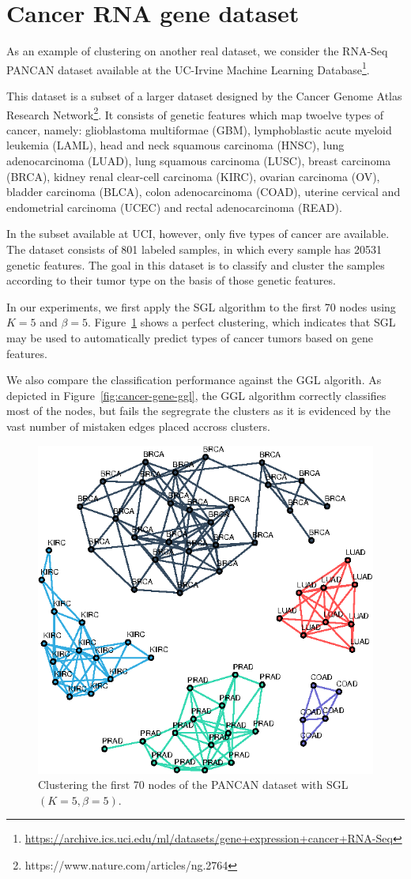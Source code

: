 \section{Cancer RNA gene dataset}

As an example of clustering on another real dataset, we consider the RNA-Seq
PANCAN dataset available at the UC-Irvine Machine Learning Database\footnote{\url{https://archive.ics.uci.edu/ml/datasets/gene+expression+cancer+RNA-Seq}}.

This dataset is a subset of a larger dataset designed by the Cancer Genome Atlas
Research Network\footnote{https://www.nature.com/articles/ng.2764}. It consists
of genetic features which map twoelve types of cancer, namely:
glioblastoma multiformae (GBM), lymphoblastic acute myeloid leukemia (LAML), head and neck squamous carcinoma (HNSC),
lung adenocarcinoma (LUAD), lung squamous carcinoma (LUSC), breast carcinoma (BRCA), kidney renal clear-cell carcinoma (KIRC),
ovarian carcinoma (OV), bladder carcinoma (BLCA), colon adenocarcinoma (COAD), uterine cervical and endometrial carcinoma (UCEC)
and rectal adenocarcinoma (READ).

In the subset available at UCI, however, only five types of cancer are available.
The dataset consists of 801 labeled samples, in which every sample has 20531 genetic
features. The goal in this dataset is to classify and cluster the samples according to
their tumor type on the basis of those genetic features.

In our experiments, we first apply the \textsf{SGL} algorithm to the first 70 nodes using
$K = 5$ and $\beta = 5$. Figure~\ref{fig:cancer-gene-sgl} shows a perfect clustering,
which indicates that \textsf{SGL} may be used to automatically predict types of cancer tumors
based on gene features.

We also compare the classification performance against the \textsf{GGL} algorith. As depicted in
Figure~\ref{fig:cancer-gene-ggl}, the \textsf{GGL} algorithm correctly classifies most of the
nodes, but fails the segregrate the clusters as it is evidenced by the vast number of mistaken
edges placed accross clusters.

\begin{figure}[!htb]
  \centering
  \includegraphics[width=.475\textwidth]{cancer-rna/latex/figures/cancer-rna-graph-subset.eps}
  \caption{Clustering the first 70 nodes of the \textsf{PANCAN} dataset with \textsf{SGL}$(K = 5, \beta = 5)$.}
  \label{fig:cancer-gene-sgl}
\end{figure}

